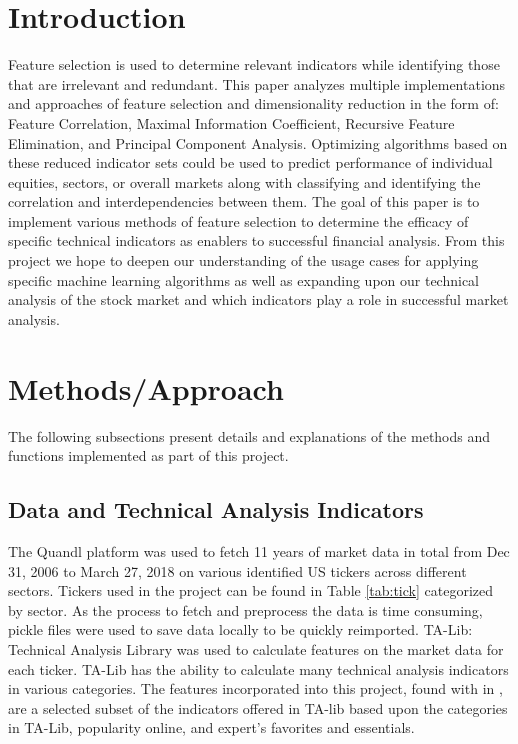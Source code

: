 \documentclass{article}\raggedbottom
\begin{document}
\section{Introduction}
	Feature selection is used to determine relevant indicators while identifying those that are irrelevant and redundant. This paper analyzes multiple implementations and approaches of feature selection and dimensionality reduction in the form of: Feature Correlation, Maximal Information Coefficient, Recursive Feature Elimination, and Principal Component Analysis. Optimizing algorithms based on these reduced indicator sets could be used to predict performance of individual equities, sectors, or overall markets along with classifying and identifying the correlation and interdependencies between them. The goal of this paper is to implement various methods of feature selection to determine the efficacy of specific technical indicators as enablers to successful financial analysis. From this project we hope to deepen our understanding of the usage cases for applying specific machine learning algorithms as well as expanding upon our technical analysis of the stock market and which indicators play a role in successful market analysis.

\section{Methods/Approach}
The following subsections present details and explanations of the methods and functions implemented as part of this project.

\subsection{Data and Technical Analysis Indicators}
The Quandl platform was used to fetch 11 years of market data in total from Dec 31, 2006 to March 27, 2018 on various identified US tickers across different sectors. Tickers used in the project can be found in Table \ref{tab:tick} categorized by sector. As the process to fetch and preprocess the data is time consuming, pickle files were used to save data locally to be quickly reimported. TA-Lib: Technical Analysis Library was used to calculate features on the market data for each ticker. TA-Lib has the ability to calculate many technical analysis indicators in various categories. The features incorporated into this project, found with in , are a selected subset of the indicators offered in TA-lib based upon the categories in TA-Lib, popularity online, and expert's favorites and essentials.
\end{document}
